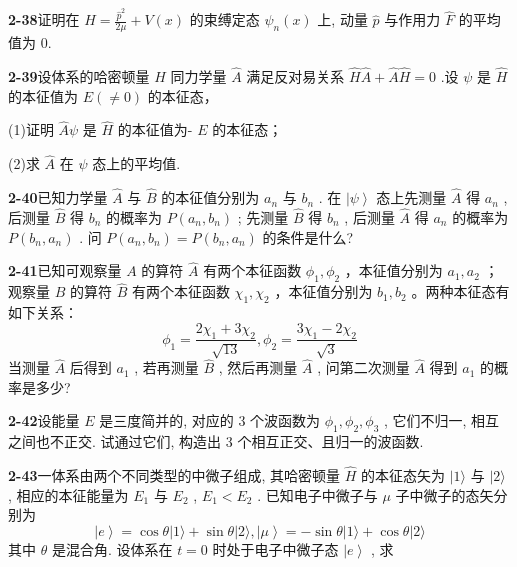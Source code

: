 \vfill

\newpage
\vfill

\noindent
\textbf{2-38}\quad 证明在 $\hat{H} = \frac{\hat{p}^2}{2\mu} + V(x)$ 的束缚定态 $\psi_n(x)$ 上, 动量 $\hat{p}$ 与作用力 $\hat{F}$ 的平均值为 0.

\vfill

\newpage
\vfill

\noindent
\textbf{2-39}\quad 设体系的哈密顿量 $\hat{H}$ 同力学量 $\hat{A}$ 满足反对易关系 $\hat{H}\hat{A} +\hat{A}\hat{H} = 0$ .设 $\psi$ 是 $\hat{H}$ 的本征值为 $E(\neq 0)$ 的本征态，

(1)证明 $\hat{A}\psi$ 是 $\hat{H}$ 的本征值为- $E$ 的本征态；

(2)求 $\hat{A}$ 在 $\psi$ 态上的平均值.

\vfill

\newpage
\vfill

\noindent
\textbf{2-40}\quad 已知力学量 $\hat{A}$ 与 $\hat{B}$ 的本征值分别为 $a_{n}$ 与 $b_{n}$ . 在 $\left|\psi\right\rangle$ 态上先测量 $\hat{A}$ 得 $a_{n}$ , 后测量 $\hat{B}$ 得 $b_{n}$ 的概率为 $P(a_{n}, b_{n})$ ; 先测量 $\hat{B}$ 得 $b_{n}$ , 后测量 $\hat{A}$ 得 $a_{n}$ 的概率为 $P(b_{n}, a_{n})$ . 问 $P(a_{n}, b_{n}) = P(b_{n}, a_{n})$ 的条件是什么?

\vfill

\newpage
\vfill

\noindent
\textbf{2-41}\quad 已知可观察量 $A$ 的算符 $\hat{A}$ 有两个本征函数 $\phi_1, \phi_2$ ，本征值分别为 $a_1, a_2$ ；观察量 $B$ 的算符 $\hat{B}$ 有两个本征函数 $\chi_1, \chi_2$ ，本征值分别为 $b_1, b_2$ 。两种本征态有如下关系：
$$
\phi_ {1} = \frac {2 \chi_ {1} + 3 \chi_ {2}}{\sqrt {1 3}}, \phi_ {2} = \frac {3 \chi_ {1} - 2 \chi_ {2}}{\sqrt {3}}
$$
当测量 $\hat{A}$ 后得到 $a_1$ , 若再测量 $\hat{B}$ , 然后再测量 $\hat{A}$ , 问第二次测量 $\hat{A}$ 得到 $a_1$ 的概率是多少?

\vfill

\newpage
\vfill

\noindent
\textbf{2-42}\quad 设能量 $E$ 是三度简并的, 对应的 3 个波函数为 $\phi_1, \phi_2, \phi_3$ , 它们不归一, 相互之间也不正交. 试通过它们, 构造出 3 个相互正交、且归一的波函数.

\vfill

\newpage
\vfill

\noindent
\textbf{2-43}\quad 一体系由两个不同类型的中微子组成, 其哈密顿量 $\hat{H}$ 的本征态矢为 $|1\rangle$ 与 $|2\rangle$ , 相应的本征能量为 $E_1$ 与 $E_2$ , $E_1 < E_2$ . 已知电子中微子与 $\mu$ 子中微子的态矢分别为
$$
\left| e \right\rangle = \cos \theta | 1 \rangle + \sin \theta | 2 \rangle , \left| \mu \right\rangle = - \sin \theta | 1 \rangle + \cos \theta | 2 \rangle
$$
其中 $\theta$ 是混合角. 设体系在 $t = 0$ 时处于电子中微子态 $\left|e\right\rangle$ , 求


